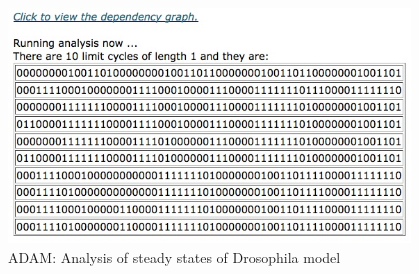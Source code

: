 \documentclass[11pt]{amsart}
\begin{document}
\begin{figure}[htb]
\centering
\includegraphics[width=0.95\textwidth]{DroAlgOutput.jpg}
\caption{ADAM: Analysis of steady states of Drosophila model}
\label{fig:alg}
\end{figure}
\end{document}
